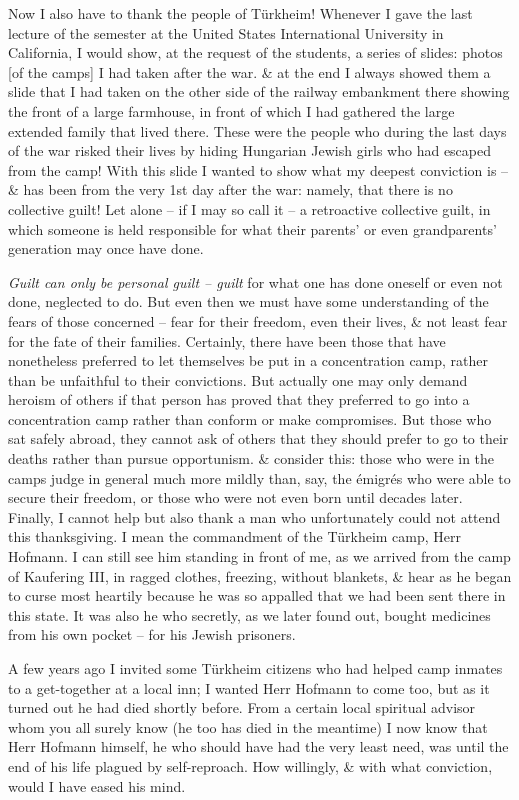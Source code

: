 \documentclass{article}
\numberwithin{equation}{section}
\begin{document}
Now I also have to thank the people of T\"urkheim! Whenever I gave the last lecture of the semester at the United States International University in California, I would show, at the request of the students, a series of slides: photos [of the camps] I had taken after the war. \& at the end I always showed them a slide that I had taken on the other side of the railway embankment there showing the front of a large farmhouse, in front of which I had gathered the large extended family that lived there. These were the people who during the last days of the war risked their lives by hiding Hungarian Jewish girls who had escaped from the camp! With this slide I wanted to show what my deepest conviction is -- \& has been from the very 1st day after the war: namely, that there is no collective guilt! Let alone -- if I may so call it -- a retroactive collective guilt, in which someone is held responsible for what their parents' or even grandparents' generation may once have done.

\textit{Guilt can only be personal guilt -- guilt} for what one has done oneself or even not done, neglected to do. But even then we must have some understanding of the fears of those concerned -- fear for their freedom, even their lives, \& not least fear for the fate of their families. Certainly, there have been those that have nonetheless preferred to let themselves be put in a concentration camp, rather than be unfaithful to their convictions. But actually one may only demand heroism of others if that person has proved that they preferred to go into a concentration camp rather than conform or make compromises. But those who sat safely abroad, they cannot ask of others that they should prefer to go to their deaths rather than pursue opportunism. \& consider this: those who were in the camps judge in general much more mildly than, say, the \'emigr\'es who were able to secure their freedom, or those who were not even born until decades later. Finally, I cannot help but also thank a man who unfortunately could not attend this thanksgiving. I mean the commandment of the T\"urkheim camp, Herr Hofmann. I can still see him standing in front of me, as we arrived from the camp of Kaufering III, in ragged clothes, freezing, without blankets, \& hear as he began to curse most heartily because he was so appalled that we had been sent there in this state. It was also he who secretly, as we later found out, bought medicines from his own pocket -- for his Jewish prisoners.


A few years ago I invited some T\"urkheim citizens who had helped camp inmates to a get-together at a local inn; I wanted Herr Hofmann to come too, but as it turned out he had died shortly before. From a certain local spiritual advisor whom you all surely know (he too has died in the meantime) I now know that Herr Hofmann himself, he who should have had the very least need, was until the end of his life plagued by self-reproach. How willingly, \& with what conviction, would I have eased his mind.
\end{document}
